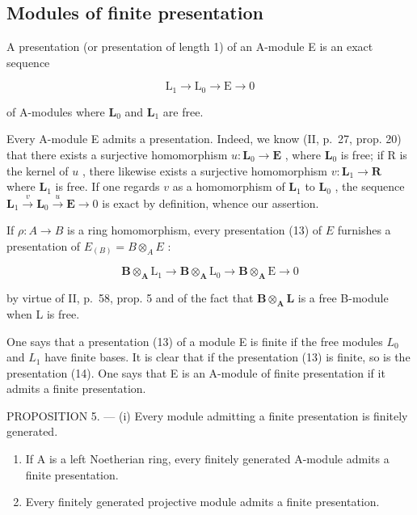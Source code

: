 \subsection{Modules of finite presentation}

A presentation (or presentation of length 1) of an A-module E is an exact sequence

\[
\mathrm{L} _ {1} \rightarrow \mathrm{L} _ {0} \rightarrow \mathrm{E} \rightarrow 0\tag{13}
\]

of A-modules where \(\mathbf{L}_0\) and \(\mathbf{L}_1\) are free.

Every A-module E admits a presentation. Indeed, we know (II, p.~27, prop. 20) that there exists a surjective homomorphism \(u: \mathbf{L}_0 \to \mathbf{E}\) , where \(\mathbf{L}_0\) is free; if R is the kernel of \(u\) , there likewise exists a surjective homomorphism \(v: \mathbf{L}_1 \to \mathbf{R}\) where \(\mathbf{L}_1\) is free. If one regards \(v\) as a homomorphism of \(\mathbf{L}_1\) to \(\mathbf{L}_0\) , the sequence \(\mathbf{L}_1 \xrightarrow{v} \mathbf{L}_0 \xrightarrow{u} \mathbf{E} \longrightarrow 0\) is exact by definition, whence our assertion.

If \(\rho: A \to B\) is a ring homomorphism, every presentation (13) of \(E\) furnishes a presentation of \(E_{(B)} = B \otimes_A E\) :

\[
\mathbf {B} \otimes_ {\mathbf {A}} \mathrm{L} _ {1} \rightarrow \mathbf {B} \otimes_ {\mathbf {A}} \mathrm{L} _ {0} \rightarrow \mathbf {B} \otimes_ {\mathbf {A}} \mathrm{E} \rightarrow 0\tag{14}
\]

by virtue of II, p.~58, prop. 5 and of the fact that \(\mathbf{B} \otimes_{\mathbf{A}} \mathbf{L}\) is a free B-module when L is free.

One says that a presentation (13) of a module E is finite if the free modules \(L_{0}\) and \(L_{1}\) have finite bases. It is clear that if the presentation (13) is finite, so is the presentation (14). One says that E is an A-module of finite presentation if it admits a finite presentation.

PROPOSITION 5. --- (i) Every module admitting a finite presentation is finitely generated.

\begin{enumerate}
\def\labelenumi{(\roman{enumi})}
\setcounter{enumi}{1}
\item
  If A is a left Noetherian ring, every finitely generated A-module admits a finite presentation.
\item
  Every finitely generated projective module admits a finite presentation.
\end{enumerate}

